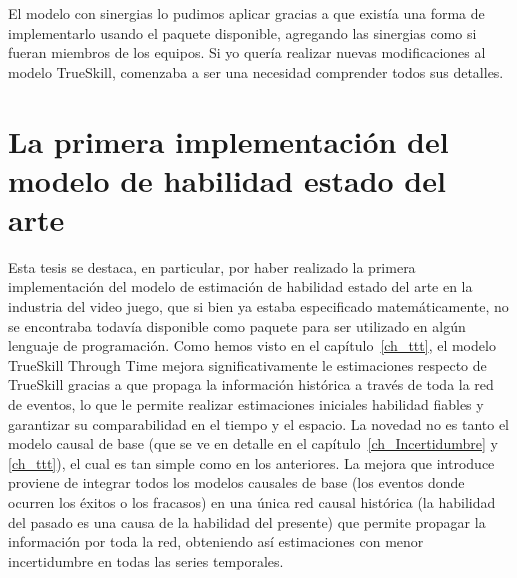 \documentclass[a4paper,11pt]{book}
\theoremstyle{definition}
\begin{document}

El modelo con sinergias lo pudimos aplicar gracias a que exist\'ia una forma de implementarlo usando el paquete disponible, agregando las sinergias como si fueran miembros de los equipos.
%
Si yo quer\'ia realizar nuevas modificaciones al modelo TrueSkill, comenzaba a ser una necesidad comprender todos sus detalles.

\section{La primera implementaci\'on del modelo de habilidad estado del arte}

Esta tesis se destaca, en particular, por haber realizado la primera implementaci\'on del modelo de estimaci\'on de habilidad estado del arte en la industria del video juego, que si bien ya estaba especificado matem\'aticamente, no se encontraba todav\'ia disponible como paquete para ser utilizado en alg\'un lenguaje de programaci\'on.
%
Como hemos visto en el cap\'itulo~\ref{ch_ttt}, el modelo TrueSkill Through Time mejora significativamente le estimaciones respecto de TrueSkill gracias a que propaga la informaci\'on hist\'orica a trav\'es de toda la red de eventos, lo que le permite realizar estimaciones iniciales habilidad fiables y garantizar su comparabilidad en el tiempo y el espacio.
%
La novedad no es tanto el modelo causal de base (que se ve en detalle en el cap\'itulo~\ref{ch_Incertidumbre} y \ref{ch_ttt}), el cual es tan simple como en los anteriores.
%
La mejora que introduce proviene de integrar todos los modelos causales de base (los eventos donde ocurren los \'exitos o los fracasos) en una \'unica red causal hist\'orica (la habilidad del pasado es una causa de la habilidad del presente) que permite propagar la informaci\'on por toda la red, obteniendo as\'i estimaciones con menor incertidumbre en todas las series temporales.

%
\end{document}
